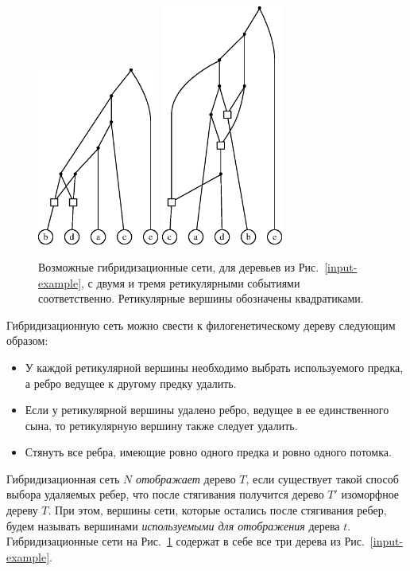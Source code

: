 \begin{figure}[t]
  \centering
  \includegraphics[width=4cm]{img/ans.eps}
  \hspace{1cm}
  \includegraphics[width=4cm]{img/ans3.eps}
  \caption{Возможные гибридизационные сети, для деревьев из Рис.~\ref{input-example}, с двумя и тремя ретикулярными событиями соответственно. Ретикулярные вершины обозначены квадратиками.}
  \label{network-example}
\end{figure}

Гибридизационную сеть можно свести к филогенетическому дереву следующим образом:

\begin{itemize}
	\item У каждой ретикулярной вершины необходимо выбрать используемого предка, а ребро ведущее к другому предку удалить.
	\item Если у ретикулярной вершины удалено ребро, ведущее в ее единственного сына, то ретикулярную вершину также следует удалить.
	\item Стянуть все ребра, имеющие ровно одного предка и ровно одного потомка.
\end{itemize}

Гибридизационная сеть $N$ \emph{отображает} дерево $T$, если существует такой способ выбора удаляемых ребер, что после стягивания получится дерево $T'$ изоморфное дереву $T$.
При этом, вершины сети, которые остались после стягивания ребер, будем называть вершинами \emph{используемыми для отображения} дерева $t$.
Гибридизационные сети на Рис.~\ref{network-example} содержат в себе все три дерева из Рис.~\ref{input-example}.

